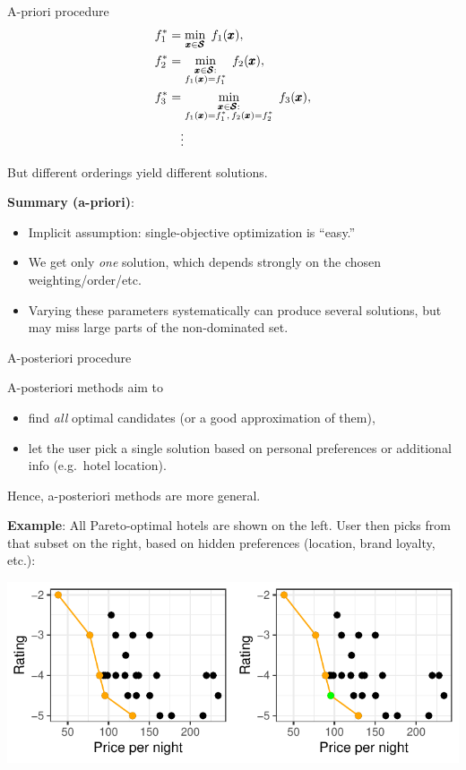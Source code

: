 \documentclass[11pt,compress,t,notes=noshow,xcolor=table]{beamer}
\newcommand{\yy}{\cost}    %
\begin{document}
\begin{vbframe}{A-priori procedure}
\[
\begin{aligned}
\yy_1^* &= \min_{\conf \in \pcs} \;\cost_1(\conf),\\
\yy_2^* &= \min_{\substack{\conf \in \pcs:\\ \cost_1(\conf)=\yy_1^*}} \;\cost_2(\conf),\\
\yy_3^* &= \min_{\substack{\conf \in \pcs:\\ \cost_1(\conf)=\yy_1^*,\,\cost_2(\conf)=\yy_2^*}} 
          \;\cost_3(\conf),\\
&\quad\vdots
\end{aligned}
\]

But different orderings yield different solutions.

\framebreak

\textbf{Summary (a-priori)}:
\begin{itemize}
\item Implicit assumption: single-objective optimization is “easy.”
\item We get only \emph{one} solution, which depends strongly on the chosen weighting/order/etc.
\item Varying these parameters systematically can produce several solutions, 
      but may miss large parts of the non-dominated set.
\end{itemize}

\end{vbframe}

\begin{vbframe}{A-posteriori procedure}

A-posteriori methods aim to
\begin{itemize}
  \item find \emph{all} optimal candidates (or a good approximation of them),
  \item let the user pick a single solution based on personal preferences or 
        additional info (e.g.\ hotel location).
\end{itemize}
Hence, a-posteriori methods are more general.

\framebreak

\textbf{Example}: 
All Pareto-optimal hotels are shown on the left. 
User then picks from that subset on the right, based on hidden preferences 
(location, brand loyalty, etc.):

\bigskip
\begin{center}
\includegraphics[scale=1]{slides/11-multicrit/figure_man/expedia-11-1.pdf}
\end{center}

\end{vbframe}
\end{document}
